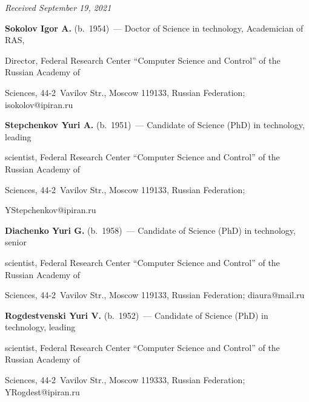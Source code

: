\hfill{\small\textit{Received September 19, 2021}}



\pagebreak



\Contr



\noindent

\textbf{Sokolov Igor A.} (b.\ 1954)~--- Doctor of Science in technology, Academician of RAS, 

Director, Federal Research Center ``Computer Science and Control'' of the Russian Academy of 

Sciences, 44-2~Vavilov Str., Moscow 119133, Russian Federation; \mbox{isokolov@ipiran.ru}



\vspace*{3pt}



\noindent

\textbf{Stepchenkov Yuri A.} (b.\ 1951)~--- Candidate of Science (PhD) in technology, leading 

scientist, Federal Research Center ``Computer Science and Control'' of the Russian Academy of 

Sciences, 44-2~Vavilov Str., Moscow 119133, Russian Federation; 

\mbox{YStepchenkov@ipiran.ru}



\vspace*{3pt}



\noindent

\textbf{Diachenko Yuri G.} (b.\ 1958)~--- Candidate of Science (PhD) in technology, senior 

scientist, Federal Research Center ``Computer Science and Control'' of the Russian Academy of 

Sciences, 44-2~Vavilov Str., Moscow 119133, Russian Federation; \mbox{diaura@mail.ru}



\vspace*{3pt}



\noindent

\textbf{Rogdestvenski Yuri V.} (b.\ 1952)~--- Candidate of Science (PhD) in technology, leading 

scientist, Federal Research Center ``Computer Science and Control'' of the Russian Academy of 

Sciences, 44-2~Vavilov Str., Moscow 119333, Russian Federation;  \mbox{YRogdest@ipiran.ru}



